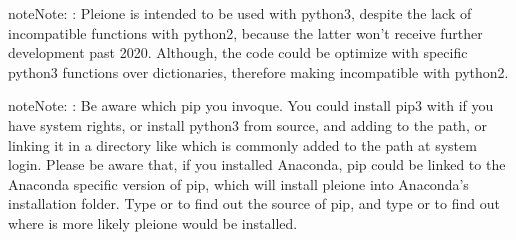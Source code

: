 \documentclass[letterpaper,10pt,english]{sphinxmanual}
\begin{document}
\begin{enumerate}
\begin{sphinxadmonition}{note}{Note:}
:
Pleione is intended to be used with python3, despite the lack of
incompatible functions with python2, because the latter won’t receive
further development past 2020. Although, the code could be optimize with
specific python3 functions over dictionaries, therefore making incompatible
with python2.
\end{sphinxadmonition}

\begin{sphinxadmonition}{note}{Note:}
:
Be aware which pip you invoque. You could install pip3 with
 if you have system rights, or
install python3 from source, and adding  to the
path, or linking it in a directory like  which is commonly
added to the path at system login. Please be aware that, if you installed
Anaconda, pip could be linked to the Anaconda specific version of pip, which
will install pleione into Anaconda’s installation folder.
Type  or  to find out the source of pip, and type
 or  to find out where is more likely
pleione would be installed.
\end{sphinxadmonition}

\end{enumerate}
\end{document}
